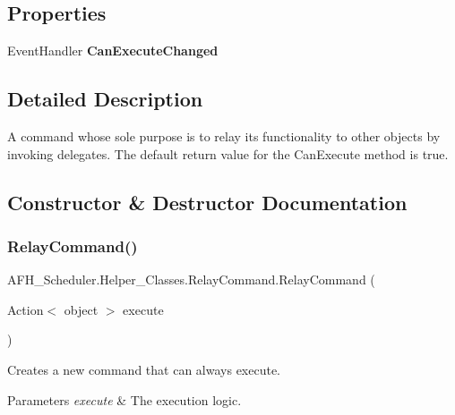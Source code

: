 \subsection*{Properties}
\begin{DoxyCompactItemize}
\item 
\mbox{\label{class_a_f_h___scheduler_1_1_helper___classes_1_1_relay_command_ab7fc1c75db46185dcdf12e28efa34286}} 
Event\+Handler {\bfseries Can\+Execute\+Changed}
\end{DoxyCompactItemize}


\subsection{Detailed Description}
A command whose sole purpose is to relay its functionality to other objects by invoking delegates. The default return value for the Can\+Execute method is \textquotesingle{}true\textquotesingle{}. 



\subsection{Constructor \& Destructor Documentation}
\mbox{\label{class_a_f_h___scheduler_1_1_helper___classes_1_1_relay_command_ab7eb476950fee37c8aa552f15a7cc92b}} 
\subsubsection{RelayCommand()\hspace{0.1cm}{\footnotesize\ttfamily [1/2]}}
{\footnotesize\ttfamily A\+F\+H\+\_\+\+Scheduler.\+Helper\+\_\+\+Classes.\+Relay\+Command.\+Relay\+Command (\begin{DoxyParamCaption}\item[{Action$<$ object $>$}]{execute }\end{DoxyParamCaption})}



Creates a new command that can always execute. 


\begin{DoxyParams}{Parameters}
{\em execute} & The execution logic.\\
\hline
\end{DoxyParams}
\mbox{\label{class_a_f_h___scheduler_1_1_helper___classes_1_1_relay_command_aae03715968d32f5b266c478a21b90525}} 

